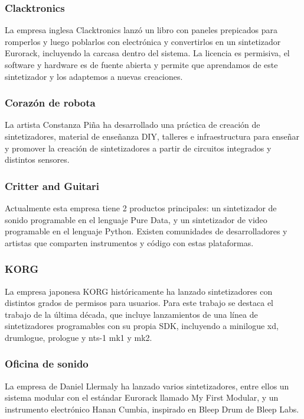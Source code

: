 \documentclass[../proyecto.tex]{subfiles}
\begin{document}
\subsubsection{Clacktronics}

La empresa inglesa Clacktronics lanzó un libro con paneles prepicados para romperlos y luego poblarlos con electrónica y convertirlos en un sintetizador Eurorack, incluyendo la carcasa dentro del sistema. La licencia es permisiva, el software y hardware es de fuente abierta y permite que aprendamos de este sintetizador y los adaptemos a nuevas creaciones.

\subsubsection{Corazón de robota}

La artista Constanza Piña ha desarrollado una práctica de creación de sintetizadores, material de enseñanza DIY, talleres e infraestructura para enseñar y promover la creación de sintetizadores a partir de circuitos integrados y distintos sensores.

\subsubsection{Critter and Guitari}

Actualmente esta empresa tiene 2 productos principales: un sintetizador de sonido programable en el lenguaje Pure Data, y un sintetizador de video programable en el lenguaje Python. Existen comunidades de desarrolladores y artistas que comparten instrumentos y código con estas plataformas.

\subsubsection{KORG}

La empresa japonesa KORG históricamente ha lanzado sintetizadores con distintos grados de permisos para usuarios. Para este trabajo se destaca el trabajo de la última década, que incluye lanzamientos de una línea de sintetizadores programables con su propia SDK, incluyendo a minilogue xd, drumlogue, prologue y nts-1 mk1 y mk2.

\subsubsection{Oficina de sonido}

La empresa de Daniel Llermaly ha lanzado varios sintetizadores, entre ellos un sistema modular con el estándar Eurorack llamado My First Modular, y un instrumento electrónico Hanan Cumbia, inspirado en Bleep Drum de Bleep Labs.
\end{document}
